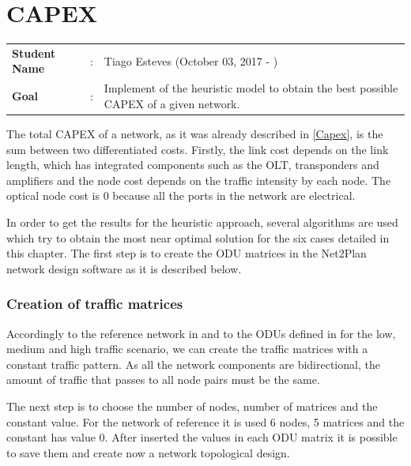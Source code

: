 \clearpage

\section{CAPEX}
\begin{tcolorbox}	
\begin{tabular}{p{2.75cm} p{0.2cm} p{10.5cm}} 	
\textbf{Student Name}  &:& Tiago Esteves    (October 03, 2017 - )\\
\textbf{Goal}          &:& Implement of the heuristic model to obtain the best possible CAPEX of a given network.
\end{tabular}
\end{tcolorbox}
\vspace{11pt}

The total CAPEX of a network, as it was already described in \ref{Capex}, is the sum between two differentiated costs. Firstly, the link cost depends on the link length, which has integrated components such as the OLT, transponders and amplifiers and the node cost depends on the traffic intensity by each node. The optical node cost is 0 because all the ports in the network are electrical.

In order to get the results for the heuristic approach, several algorithms are used which try to obtain the most near optimal solution for the six cases detailed in this chapter. The first step is to create the ODU matrices in the Net2Plan network design software as it is described below.

\subsubsection{Creation of traffic matrices}\label{creation_traffic_matrices}

Accordingly to the reference network in \label{Reference_Network_Traffic} and to the ODUs defined in \label{low_traffic_scenario} for the low, medium and high traffic scenario, we can create the traffic matrices with a constant traffic pattern. As all the network components are bidirectional, the amount of traffic that passes to all node pairs must be the same.

The next step is to choose the number of nodes, number of matrices and the constant value. For the network of reference it is used 6 nodes, 5 matrices and the constant has value 0. After inserted the values in each ODU matrix it is possible to save them and create now a network topological design.

